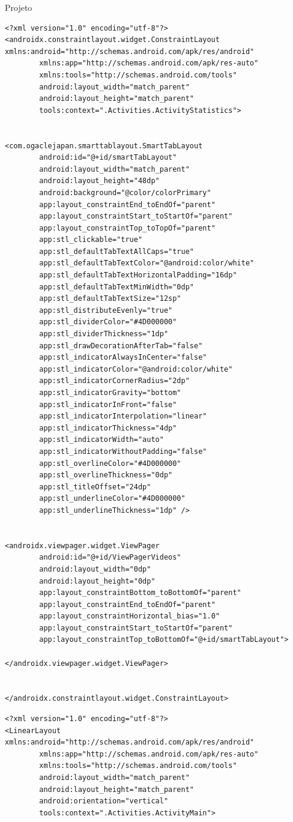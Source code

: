 \documentclass[
	12pt,				%
	openright,			%
	twoside,			%
	a4paper,			%
	english,			%
	french,				%
	spanish,			%
	brazil				%
	]{abntex2}
\begin{document}
\begin{chapter}{Projeto}
\begin{lstlisting}[numbers=none,basicstyle=\small,
caption={ActivityVideos.xml},
title={ActivityVideos.xml},
label={ActivityVideos.xml}]
<?xml version="1.0" encoding="utf-8"?>
<androidx.constraintlayout.widget.ConstraintLayout xmlns:android="http://schemas.android.com/apk/res/android"
		xmlns:app="http://schemas.android.com/apk/res-auto"
		xmlns:tools="http://schemas.android.com/tools"
		android:layout_width="match_parent"
		android:layout_height="match_parent"
		tools:context=".Activities.ActivityStatistics">


<com.ogaclejapan.smarttablayout.SmartTabLayout
		android:id="@+id/smartTabLayout"
		android:layout_width="match_parent"
		android:layout_height="48dp"
		android:background="@color/colorPrimary"
		app:layout_constraintEnd_toEndOf="parent"
		app:layout_constraintStart_toStartOf="parent"
		app:layout_constraintTop_toTopOf="parent"
		app:stl_clickable="true"
		app:stl_defaultTabTextAllCaps="true"
		app:stl_defaultTabTextColor="@android:color/white"
		app:stl_defaultTabTextHorizontalPadding="16dp"
		app:stl_defaultTabTextMinWidth="0dp"
		app:stl_defaultTabTextSize="12sp"
		app:stl_distributeEvenly="true"
		app:stl_dividerColor="#4D000000"
		app:stl_dividerThickness="1dp"
		app:stl_drawDecorationAfterTab="false"
		app:stl_indicatorAlwaysInCenter="false"
		app:stl_indicatorColor="@android:color/white"
		app:stl_indicatorCornerRadius="2dp"
		app:stl_indicatorGravity="bottom"
		app:stl_indicatorInFront="false"
		app:stl_indicatorInterpolation="linear"
		app:stl_indicatorThickness="4dp"
		app:stl_indicatorWidth="auto"
		app:stl_indicatorWithoutPadding="false"
		app:stl_overlineColor="#4D000000"
		app:stl_overlineThickness="0dp"
		app:stl_titleOffset="24dp"
		app:stl_underlineColor="#4D000000"
		app:stl_underlineThickness="1dp" />


<androidx.viewpager.widget.ViewPager
		android:id="@+id/ViewPagerVideos"
		android:layout_width="0dp"
		android:layout_height="0dp"
		app:layout_constraintBottom_toBottomOf="parent"
		app:layout_constraintEnd_toEndOf="parent"
		app:layout_constraintHorizontal_bias="1.0"
		app:layout_constraintStart_toStartOf="parent"
		app:layout_constraintTop_toBottomOf="@+id/smartTabLayout">

</androidx.viewpager.widget.ViewPager>


</androidx.constraintlayout.widget.ConstraintLayout>
\end{lstlisting}

\begin{lstlisting}[numbers=none,basicstyle=\small,
caption={FragmentVideos.xml},
title={FragmentVideos.xml},
label={FragmentVideos.xml}]
<?xml version="1.0" encoding="utf-8"?>
<LinearLayout xmlns:android="http://schemas.android.com/apk/res/android"
		xmlns:app="http://schemas.android.com/apk/res-auto"
		xmlns:tools="http://schemas.android.com/tools"
		android:layout_width="match_parent"
		android:layout_height="match_parent"
		android:orientation="vertical"
		tools:context=".Activities.ActivityMain">


\end{lstlisting}
\end{chapter}
\end{document}
